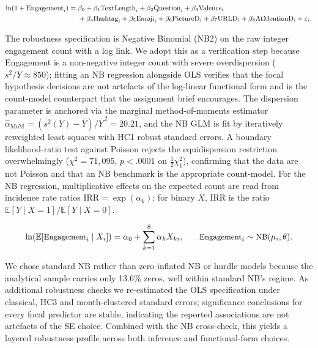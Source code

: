 \documentclass[12pt,a4paper]{article}
\begin{document}
\begin{equation}\small
\begin{aligned}
\ln(1+\text{Engagement}_i) ={}& \beta_0 + \beta_1\text{TextLength}_i + \beta_2\text{Question}_i + \beta_3\text{Valence}_i \\
& + \beta_4\text{Hashtag}_i + \beta_5\text{Emoji}_i + \beta_6\text{PictureD}_i + \beta_7\text{URLD}_i + \beta_8\text{AtMentionD}_i + \varepsilon_i.
\end{aligned}
\end{equation}

The robustness specification is Negative Binomial (NB2) on the raw integer engagement count with a log link. We adopt this as a verification step because Engagement is a non-negative integer count with severe overdispersion ($s^2/\bar Y \approx 850$); fitting an NB regression alongside OLS verifies that the focal hypothesis decisions are not artefacts of the log-linear functional form and is the count-model counterpart that the assignment brief encourages. The dispersion parameter is anchored via the marginal method-of-moments estimator $\hat\alpha_{\text{MoM}}=(s^2(Y)-\bar Y)/\bar Y^{\,2}=20.21$, and the NB GLM is fit by iteratively reweighted least squares with HC1 robust standard errors. A boundary likelihood-ratio test against Poisson rejects the equidispersion restriction overwhelmingly ($\chi^2=71{,}095$, $p<.0001$ on $\tfrac12 \chi^2_1$), confirming that the data are not Poisson and that an NB benchmark is the appropriate count-model. For the NB regression, multiplicative effects on the expected count are read from incidence rate ratios $\text{IRR}=\exp(\alpha_k)$; for binary $X$, $\text{IRR}$ is the ratio $\mathbb{E}[Y\mid X=1]/\mathbb{E}[Y\mid X=0]$.

\begin{equation}\small
\ln(\mathbb{E}[\text{Engagement}_i \mid X_i]) = \alpha_0 + \sum_{k=1}^{8}\alpha_k X_{ki},\qquad \text{Engagement}_i \sim \text{NB}(\mu_i, \theta).
\end{equation}

We chose standard NB rather than zero-inflated NB or hurdle models because the analytical sample carries only 13.6\% zeros, well within standard NB's regime. As additional robustness checks we re-estimated the OLS specification under classical, HC3 and month-clustered standard errors; significance conclusions for every focal predictor are stable, indicating the reported associations are not artefacts of the SE choice. Combined with the NB cross-check, this yields a layered robustness profile across both inference and functional-form choices.
\end{document}
